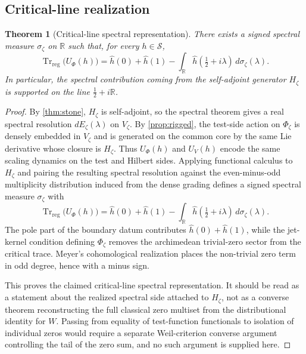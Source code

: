 \documentclass[11pt,a4paper]{article}
\theoremstyle{plain}
\newtheorem{theorem}{Theorem}[section]
\theoremstyle{definition}
\newcommand{\R}{\mathbb{R}}
\newcommand{\Trreg}{\operatorname{Tr}_{\mathrm{reg}}}
\begin{document}
\subsection{Critical-line realization}

\begin{theorem}[Critical-line spectral representation]
\label{thm:critical-line}
There exists a signed spectral measure $\sigma_{\zeta}$ on $\R$ such that, for every $h\in\mathscr S$,
\[
  \Trreg\bigl(U_{\Phi}(h)\bigr)
  =
  \widehat h(0)+\widehat h(1)
  -
  \int_{\R}\widehat h\!\left(\tfrac12+i\lambda\right)\,d\sigma_{\zeta}(\lambda).
\]
In particular, the spectral contribution coming from the self-adjoint generator $H_{\zeta}$ is supported on the line $\tfrac12+i\R$.
\end{theorem}

\begin{proof}
By \cref{thm:stone}, $H_{\zeta}$ is self-adjoint, so the spectral theorem gives a real spectral resolution $dE_{\zeta}(\lambda)$ on $V_{\zeta}$. By \cref{prop:rigged}, the test-side action on $\Phi_{\zeta}$ is densely embedded in $V_{\zeta}$ and is generated on the common core by the same Lie derivative whose closure is $H_{\zeta}$. Thus $U_{\Phi}(h)$ and $U_V(h)$ encode the same scaling dynamics on the test and Hilbert sides. Applying functional calculus to $H_{\zeta}$ and pairing the resulting spectral resolution against the even-minus-odd multiplicity distribution induced from the dense grading defines a signed spectral measure $\sigma_{\zeta}$ with
\[
  \Trreg\bigl(U_{\Phi}(h)\bigr)
  =
  \widehat h(0)+\widehat h(1)
  -
  \int_{\R}\widehat h\!\left(\tfrac12+i\lambda\right)\,d\sigma_{\zeta}(\lambda).
\]
The pole part of the boundary datum contributes $\widehat h(0)+\widehat h(1)$, while the jet-kernel condition defining $\Phi_{\zeta}$ removes the archimedean trivial-zero sector from the critical trace. Meyer's cohomological realization places the non-trivial zero term in odd degree, hence with a minus sign.

This proves the claimed critical-line spectral representation. It should be read as a statement about the realized spectral side attached to $H_{\zeta}$, not as a converse theorem reconstructing the full classical zero multiset from the distributional identity for $W$. Passing from equality of test-function functionals to isolation of individual zeros would require a separate Weil-criterion converse argument controlling the tail of the zero sum, and no such argument is supplied here.
\end{proof}
\end{document}
